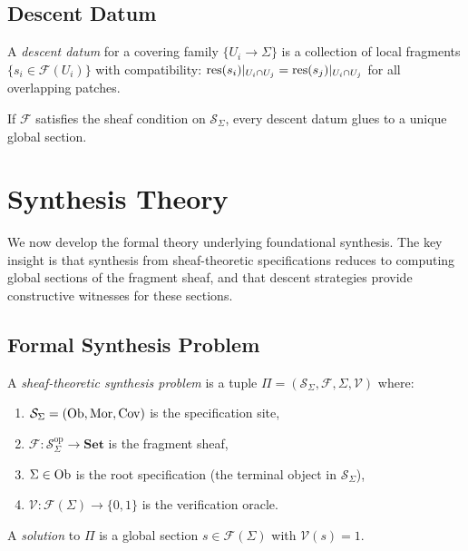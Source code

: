 \documentclass[11pt]{article}
\newcommand{\FragmentSpace}{\mathcal{F}}
\newcommand{\SpecSpace}{\mathcal{S}_\Sigma}
\begin{document}
\subsection{Descent Datum}
A \emph{descent datum} for a covering family $\{U_i \to \Sigma\}$ is
a collection of local fragments $\{s_i \in \FragmentSpace(U_i)\}$ with
compatibility: $\mathrm{res}(s_i)|_{U_i \cap U_j} = \mathrm{res}(s_j)|_{U_i \cap U_j}$
for all overlapping patches.

\begin{proposition}\label{prop:effective-descent}
If $\FragmentSpace$ satisfies the sheaf condition on $\SpecSpace$,
every descent datum glues to a unique global section.
\end{proposition}

\section{Synthesis Theory}\label{sec:synthesis-theory}

We now develop the formal theory underlying foundational synthesis.
The key insight is that synthesis from sheaf-theoretic specifications
reduces to computing global sections of the fragment sheaf, and that
descent strategies provide constructive witnesses for these sections.

\subsection{Formal Synthesis Problem}

\begin{definition}\label{def:synth-problem}
A \emph{sheaf-theoretic synthesis problem} is a tuple
$\Pi = (\SpecSpace, \FragmentSpace, \Sigma, \mathcal{V})$ where:
\begin{enumerate}[noitemsep]
  \item $\SpecSpace = (\Ob, \Mor, \Cov)$ is the specification site,
  \item $\FragmentSpace : \SpecSpace^{\mathrm{op}} \to \mathbf{Set}$ is
        the fragment sheaf,
  \item $\Sigma \in \mathrm{Ob}$ is the root specification (the terminal object
        in $\SpecSpace$),
  \item $\mathcal{V} : \FragmentSpace(\Sigma) \to \{0,1\}$ is the
        verification oracle.
\end{enumerate}
A \emph{solution} to $\Pi$ is a global section
$s \in \FragmentSpace(\Sigma)$ with $\mathcal{V}(s) = 1$.
\end{definition}
\end{document}
